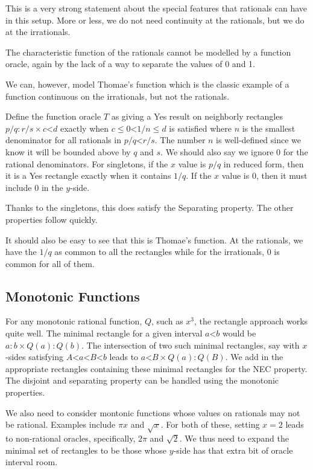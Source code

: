 \documentclass[12pt]{article}
\theoremstyle{remark}
\newcommand{\lt}{\mathord{<}}
\begin{document}
This is a very strong statement about the special features that rationals can have in this setup. More or less, we do not need continuity at the rationals, but we do at the irrationals. 

The characteristic function of the rationals cannot be modelled by a function oracle, again by the lack of a way to separate the values of 0 and 1. 

We can, however, model Thomae's function which is the classic example of a function continuous on the irrationals, but not the rationals. 

Define the function oracle $T$ as giving a Yes result on neighborly rectangles $p/q : r/s \times c\lt d$ exactly when $c \leq 0 \lt 1/n \leq d$ is satisfied where $n$ is the smallest denominator for all rationals in $p/q \lt r/s$. The number $n$ is well-defined since we know it will be bounded above by $q$ and $s$.  We should also say we ignore $0$ for the rational denominators. For singletons, if the $x$ value is $p/q$ in reduced form, then it is a Yes rectangle exactly when it contains $1/q$. If the $x$ value is $0$, then it must include $0$ in the $y$-side.

Thanks to the singletons, this does satisfy the Separating property. The other properties follow quickly. 

It should also be easy to see that this is Thomae's function. At the rationals, we have the $1/q$ as common to all the rectangles while for the irrationals, $0$ is common for all of them. 

\subsection{Monotonic Functions}

For any monotonic rational function, $Q$, such as $x^3$, the rectangle approach works quite well. The minimal rectangle for a given interval $a \lt b$ would be $a:b \times Q(a):Q(b)$. The intersection of two such minimal rectangles, say with $x$-sides satisfying $A \lt a \lt B \lt b$ leads to $a \lt B  \times  Q(a):Q(B) $. We add in the appropriate rectangles containing these minimal rectangles for the NEC property. The disjoint and separating property can be handled using the monotonic properties. 

We also need to consider montonic functions whose values on rationals may not be rational. Examples include $\pi x$ and $\sqrt{x}$. For both of these, setting $x=2$ leads to non-rational oracles, specifically, $2 \pi$ and $\sqrt{2}$. We thus need to expand the minimal set of rectangles to be those whose $y$-side has that extra bit of oracle interval room. 
\end{document}
